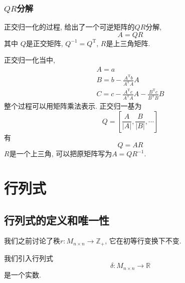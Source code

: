\subsubsection{$QR$分解}
正交归一化的过程, 给出了一个可逆矩阵的$QR$分解,
\begin{equation}
  A = QR
\end{equation}
其中 $Q$是正交矩阵, $Q^{-1} = Q^{\mathrm{T}}$, $R$是上三角矩阵.

正交归一化当中,
\begin{gather}
    A = a
    \\
    B = b - \frac{A^{\mathrm{T}}b}{A^{\mathrm{T}}A}A
    \\
    C = c - \frac{A^{\mathrm{T}}c}{A^{\mathrm{T}}A}A - \frac{B^{\mathrm{T}}c}{B^{\mathrm{T}}B}B
\end{gather}
整个过程可以用矩阵乘法表示. 正交归一基为
\begin{equation}
  Q = \left[ \frac{A}{|A|} , \frac{B}{|B|}, \cdots   \right] 
\end{equation}
有
\begin{equation}
  Q = AR
\end{equation}
$R$是一个上三角, 可以把原矩阵写为$A = Q R^{-1}$.

\section{行列式}

\subsection{行列式的定义和唯一性}
我们之前讨论了秩$r\colon M_{n \times n} \to \mathbb{Z}_{+}$, 它在初等行变换下不变.

我们引入行列式
\begin{equation}
  \delta\colon M_{n \times n} \to \mathbb{R}
\end{equation}
是一个实数.

